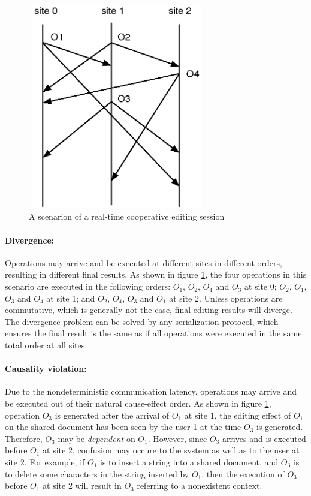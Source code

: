 \documentclass[11pt,a4paper]{article}
\begin{document}
\begin{figure}
 \centering
 \includegraphics[width=3.06in,height=3.53in]{../../images/example1.eps}
 \caption{A scenarion of a real-time cooperative editing session}
 \label{fig:example1}
\end{figure}

\paragraph{Divergence:}
Operations may arrive and be executed at different sites in different orders, resulting in different final results. As shown in figure \ref{fig:example1}, the four operations in this scenario are executed in the following orders: $O_{1}$, $O_{2}$, $O_{4}$ and $O_{3}$ at site 0; $O_{2}$, $O_{1}$, $O_{3}$ and $O_{4}$ at site 1; and $O_{2}$, $O_{4}$, $O_{3}$ and $O_{1}$ at site 2. Unless operations are commutative, which is generally not the case, final editing results will diverge. The divergence problem can be solved by any serialization protocol, which ensures the final result is the same as if all operations were executed in the same total order at all sites.

\paragraph{Causality violation:}
Due to the nondeterministic communication latency, operations may arrive and be executed out of their natural cause-effect order. As shown in figure \ref{fig:example1}, operation $O_{3}$ is generated after the arrival of $O_{1}$ at site 1, the editing effect of $O_{1}$ on the shared document has been seen by the user 1 at the time $O_{3}$ is generated. Therefore, $O_{3}$ may be \emph{dependent} on $O_{1}$. However, since $O_{3}$ arrives and is executed before $O_{1}$ at site 2, confusion may occure to the system as well as to the user at site 2. For example, if $O_{1}$ is to insert a string into a shared document, and $O_{3}$ is to delete some characters in the string inserted by $O_{1}$, then the execution of $O_{3}$ before $O_{1}$ at site 2 will result in $O_{3}$ referring to a nonexistent context. 
\end{document}
